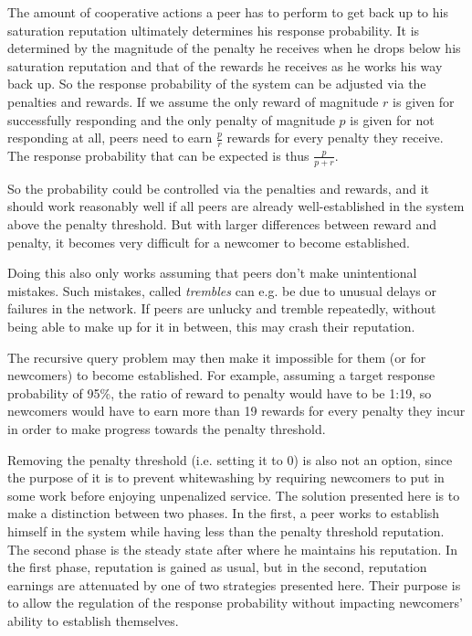 The amount of cooperative actions a peer has to perform to get back up to his
saturation reputation ultimately determines his response probability. It is
determined by the magnitude of the penalty he receives when he drops below his
saturation reputation and that of the rewards he receives as he works his way
back up. So the response probability of the system can be adjusted via the
penalties and rewards. If we assume the only reward of magnitude $r$ is given
for successfully responding and the only penalty of magnitude $p$ is given for
not responding at all, peers need to earn $\frac{p}{r}$ rewards for every
penalty they receive. The response probability that can be expected is thus
$\frac{p}{p + r}$.

So the probability could be controlled via the penalties and rewards, and it
should work reasonably well if all peers are already well-established in the
system above the penalty threshold. But with larger differences between
reward and penalty, it becomes very difficult for a newcomer to become
established.

Doing this also only works assuming that peers don't make unintentional
mistakes. Such mistakes, called \emph{trembles} can e.g. be due to unusual
delays or failures in the network. If peers are unlucky and tremble repeatedly,
without being able to make up for it in between, this may crash their
reputation.

The recursive query problem may then make it impossible for them (or for
newcomers) to become established. For example, assuming a target response
probability of 95\%, the ratio of reward to penalty would have to be 1:19, so
newcomers would have to earn more than 19 rewards for every penalty they incur
in order to make progress towards the penalty threshold.

Removing the penalty threshold (i.e. setting it to 0) is also not an option,
since the purpose of it is to prevent whitewashing by requiring newcomers to put
in some work before enjoying unpenalized service. The solution presented here is
to make a distinction between two phases. In the first, a peer works to
establish himself in the system while having less than the penalty threshold
reputation. The second phase is the steady state after where he maintains his
reputation. In the first phase, reputation is gained as usual, but in the
second, reputation earnings are attenuated by one of two strategies presented
here. Their purpose is to allow the regulation of the response probability
without impacting newcomers' ability to establish themselves.

